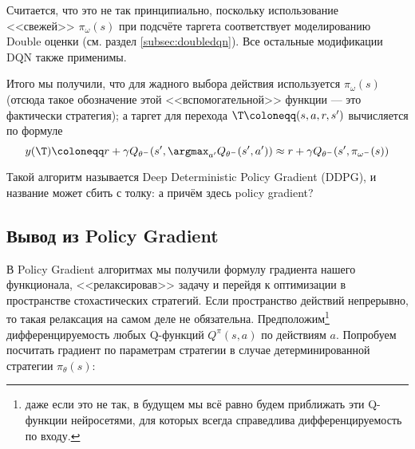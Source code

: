 \begin{remark}
Считается, что это не так принципиально, поскольку использование <<свежей>> $\pi_{\omega}(s)$ при подсчёте таргета соответствует моделированию Double оценки (см. раздел \ref{subsec:doubledqn}). Все остальные модификации DQN также применимы.
\end{remark}

Итого мы получили, что для жадного выбора действия используется $\pi_{\omega}(s)$ (отсюда такое обозначение этой <<вспомогательной>> функции --- это фактически стратегия); а таргет для перехода $\T \coloneqq (s, a, r, s')$ вычисляется по формуле
$$y(\T) \coloneqq r + \gamma Q_{\theta^{-}}(s', \argmax_{a'} Q_{\theta^{-}}(s', a')) \approx r + \gamma Q_{\theta^{-}}(s', \pi_{\omega^{-}}(s))$$

Такой алгоритм называется Deep Deterministic Policy Gradient (DDPG), и название может сбить с толку: а причём здесь policy gradient?

\subsection{Вывод из Policy Gradient}


В Policy Gradient алгоритмах мы получили формулу градиента нашего функционала, <<релаксировав>> задачу и перейдя к оптимизации в пространстве стохастических стратегий. Если пространство действий непрерывно, то такая релаксация на самом деле не обязательна. Предположим\footnote{даже если это не так, в будущем мы всё равно будем приближать эти Q-функции нейросетями, для которых всегда справедлива дифференцируемость по входу.} дифференцируемость любых Q-функций $Q^{\pi}(s, a)$ по действиям $a$. Попробуем посчитать градиент по параметрам стратегии в случае детерминированной стратегии $\pi_\theta(s)$:

